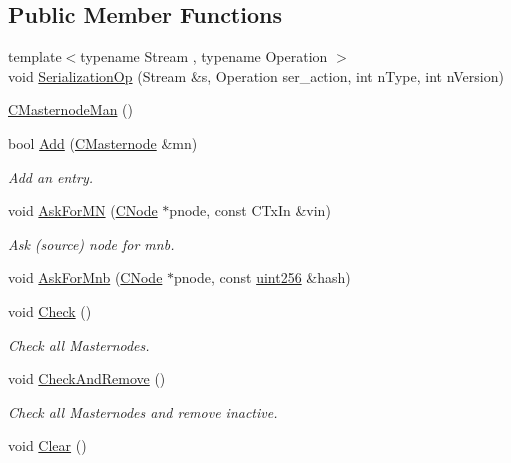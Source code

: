 \subsection*{Public Member Functions}
\begin{DoxyCompactItemize}
\item 
{\footnotesize template$<$typename Stream , typename Operation $>$ }\\void \mbox{\hyperlink{class_c_masternode_man_ab8cf7d821cda80603d10fb47f626d514}{Serialization\+Op}} (Stream \&s, Operation ser\+\_\+action, int n\+Type, int n\+Version)
\item 
\mbox{\hyperlink{class_c_masternode_man_a6bc39eb089225397b2d4dd5c1d291868}{C\+Masternode\+Man}} ()
\item 
bool \mbox{\hyperlink{class_c_masternode_man_a8e648f7e96931e683b3fd6c98a4c4715}{Add}} (\mbox{\hyperlink{class_c_masternode}{C\+Masternode}} \&mn)
\begin{DoxyCompactList}\small\item\em Add an entry. \end{DoxyCompactList}\item 
void \mbox{\hyperlink{class_c_masternode_man_a4399c66e350203fa10348367ff8a78d1}{Ask\+For\+MN}} (\mbox{\hyperlink{class_c_node}{C\+Node}} $\ast$pnode, const C\+Tx\+In \&vin)
\begin{DoxyCompactList}\small\item\em Ask (source) node for mnb. \end{DoxyCompactList}\item 
void \mbox{\hyperlink{class_c_masternode_man_aa900ccb8dc8ce296adda49b9b9fb7020}{Ask\+For\+Mnb}} (\mbox{\hyperlink{class_c_node}{C\+Node}} $\ast$pnode, const \mbox{\hyperlink{classuint256}{uint256}} \&hash)
\item 
void \mbox{\hyperlink{class_c_masternode_man_a746a5bed8674a37f69f8987a2bd9bcd1}{Check}} ()
\begin{DoxyCompactList}\small\item\em Check all Masternodes. \end{DoxyCompactList}\item 
void \mbox{\hyperlink{class_c_masternode_man_a80d8c81259d9b7ae0d337c93d1291550}{Check\+And\+Remove}} ()
\begin{DoxyCompactList}\small\item\em Check all Masternodes and remove inactive. \end{DoxyCompactList}\item 
void \mbox{\hyperlink{class_c_masternode_man_ab18e991ea61209e6282aee80121724dd}{Clear}} ()

\end{DoxyCompactItemize}
